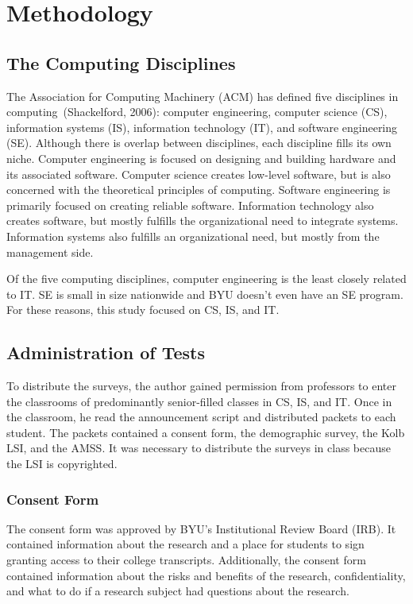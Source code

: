 \chapter{Methodology}\label{chp:chapter3}
\section{The Computing Disciplines}
The Association for Computing Machinery (ACM) has defined five disciplines in com\-put\-ing~(Shackelford, 2006): computer engineering, computer science (CS), information systems (IS), information technology (IT), and software engineering (SE). Although there is overlap between disciplines, each discipline fills its own niche. Computer engineering is focused on designing and building hardware and its associated software. Computer science creates low-level software, but is also concerned with the theoretical principles of computing. Software engineering is primarily focused on creating reliable software. Information technology also creates software, but mostly fulfills the organizational need to integrate systems. Information systems also fulfills an organizational need, but mostly from the management side.

Of the five computing disciplines, computer engineering is the least closely related to IT. SE is small in size nationwide and BYU doesn't even have an SE program. For these reasons, this study focused on CS, IS, and IT.

\section{Administration of Tests}
To distribute the surveys, the author gained permission from professors to enter the classrooms of predominantly senior-filled classes in CS, IS, and IT. Once in the classroom, he read the announcement script and distributed packets to each student. The packets contained a consent form, the demographic survey, the Kolb LSI, and the AMSS. It was necessary to distribute the surveys in class because the LSI is copyrighted.

\subsection{Consent Form}
The consent form was approved by BYU's Institutional Review Board (IRB). It contained information about the research and a place for students to sign granting access to their college transcripts. Additionally, the consent form contained information about the risks and benefits of the research, confidentiality, and what to do if a research subject had questions about the research.

